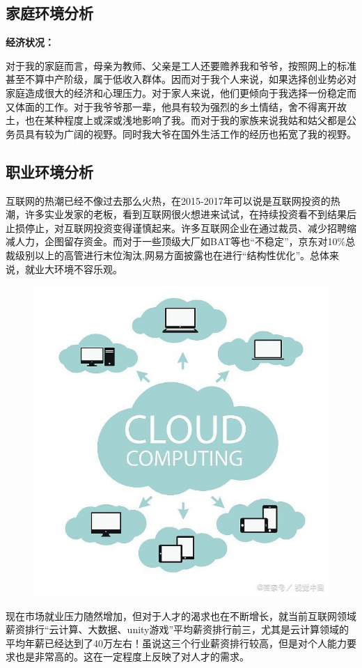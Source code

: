 \documentclass{article}
\begin{document}
\subsection{家庭环境分析}
	\noindent\textbf{经济状况：}\par 
	对于我的家庭而言，母亲为教师、父亲是工人还要赡养我和爷爷，按照网上的标准甚至不算中产阶级，属于低收入群体。因而对于我个人来说，如果选择创业势必对家庭造成很大的经济和心理压力。对于家人来说，他们更倾向于我选择一份稳定而又体面的工作。对于我爷爷那一辈，他具有较为强烈的乡土情结，舍不得离开故土，也在某种程度上或深或浅地影响了我。而对于我的家族来说我姑和姑父都是公务员具有较为广阔的视野。同时我大爷在国外生活工作的经历也拓宽了我的视野。
\subsection{职业环境分析}
	互联网的热潮已经不像过去那么火热，在2015-2017年可以说是互联网投资的热潮，许多实业发家的老板，看到互联网很火想进来试试，在持续投资看不到结果后止损停止，对互联网投资变得谨慎起来。许多互联网企业在通过裁员、减少招聘缩减人力，企图留存资金。而对于一些顶级大厂如BAT等也“不稳定”，京东对10\%总裁级别以上的高管进行末位淘汰,网易方面披露也在进行“结构性优化”。总体来说，就业大环境不容乐观。 \par 
	\begin{figure}[h!]
	\centering
	\includegraphics[scale=0.5]{cloud.jpeg}
	\end{figure}
	现在市场就业压力随然增加，但对于人才的渴求也在不断增长，就当前互联网领域薪资排行“云计算、大数据、unity游戏”平均薪资排行前三，尤其是云计算领域的平均年薪已经达到了40万左右！虽说这三个行业薪资排行较高，但是对个人能力要求也是非常高的。这在一定程度上反映了对人才的需求。
	
\end{document}
